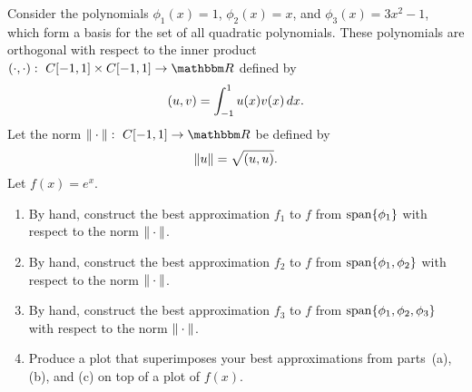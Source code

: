 Consider the polynomials $\phi_1(x) = 1$, $\phi_2(x) = x$, 
and $\phi_3(x) = 3x^2-1$, which form a basis for the set
of all quadratic polynomials.  These polynomials are 
orthogonal with respect to the inner product $\ip{\cdot,\cdot}:\mbox{ }C[-1,1]\times C[-1,1]\rightarrow\R$ defined by
\[ (u,v) = \int_{-1}^1 u(x)v(x)\, dx.\]
Let the norm $\norm{\cdot}:\mbox{ }C[-1,1]\rightarrow\R$ be defined by
\[ \|u\| = \sqrt{(u,u)}.\]
Let $f(x) = e^x$.
\begin{enumerate}
\item By hand, construct the best approximation $f_1$ to $f$ from ${\rm span}\{\phi_1\}$ with respect to the norm $\|\cdot\|$.
\\
\item By hand, construct the best approximation $f_2$ to $f$ from ${\rm span}\{\phi_1,\phi_2\}$ with respect to the norm $\|\cdot\|$.
\\
\item By hand, construct the best approximation $f_3$ to $f$ from ${\rm span}\{\phi_1,\phi_2,\phi_3\}$ with respect to the norm $\|\cdot\|$.
\\
\item  Produce a plot that superimposes your best approximations from parts~(a), (b), and (c) on top of a plot of $f(x)$.
\end{enumerate}



